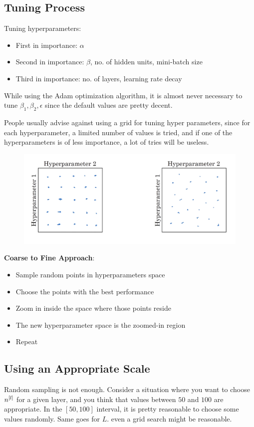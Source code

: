 \subsection{Tuning Process}
Tuning hyperparameters: 
\begin{itemize}
    \item First in importance: $\alpha$
    \item Second in importance: $\beta$, no. of hidden units, mini-batch size
    \item Third in importance: no. of layers, learning rate decay
\end{itemize}

While using the Adam optimization algorithm, it is almost never necessary to tune $\beta_1, \beta_2, \epsilon$ since the default values are pretty decent.

People usually advise against using a grid for tuning hyper parameters, since for each hyperparameter, a limited number of values is tried, and if one of the hyperparameters is of less importance, a lot of tries will be useless. 
\begin{figure}[H]
    \includegraphics[scale=0.25]{images/hyp.png}
    \centering
\end{figure}

\textbf{Coarse to Fine Approach}: 
\begin{itemize}
    \item Sample random points in hyperparameters space
    \item Choose the points with the best performance
    \item Zoom in inside the space where those points reside
    \item The new hyperparameter space is the zoomed-in region
    \item Repeat
\end{itemize}

\subsection{Using an Appropriate Scale}
Random sampling is not enough. Consider a situation where you want to choose $n^{[l]}$ for a given layer, and you think that values between $50$ and $100$ are appropriate. 
In the $[50, 100]$ interval, it is pretty reasonable to choose some values randomly. 
Same goes for $L$. even a grid search might be reasonable. 

